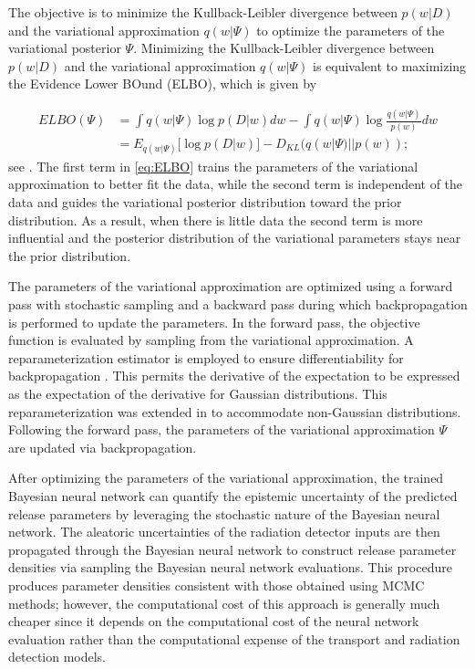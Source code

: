 \documentclass[sn-mathphys-ay]{sn-jnl}
\begin{document}
The objective is to minimize the Kullback-Leibler divergence between $p(w | D)$ and the variational approximation $q(w | \Psi)$ to optimize the parameters of the variational posterior $\Psi$. Minimizing the Kullback-Leibler divergence between $p(w | D)$ and the variational approximation $q(w | \Psi)$ is equivalent to maximizing the Evidence Lower BOund (ELBO), which is given by

\begin{equation}
\begin{split}
\label{eq:ELBO}
ELBO(\Psi) &= \int q(w | \Psi) \log{p(D | w)}dw - \int q(w |\Psi)\log{\frac{q(w | \Psi)}{p(w)}} dw \\
&=E_{q(w |\Psi)}\big[\log{p(D | w)}\big]-D_{KL}(q(w |\Psi)|| p(w)); 
\end{split}
\end{equation}
see \citep{Cinelli}. The first term in \eqref{eq:ELBO} trains the parameters of the variational approximation to better fit the data, while the second term is independent of the data and guides the variational posterior distribution toward the prior distribution. As a result, when there is little data the second term is more influential and the posterior distribution of the variational parameters stays near the prior distribution.

The parameters of the variational approximation are optimized using a forward pass with stochastic sampling and a backward pass during which backpropagation is performed to update the parameters. In the forward pass, the objective function is evaluated by sampling from the variational approximation. A reparameterization estimator is employed to ensure differentiability for backpropagation \citep{Kingma}. This permits the derivative of the expectation to be expressed as the expectation of the derivative for Gaussian distributions. This reparameterization was extended in \citep{Blundell} to accommodate non-Gaussian distributions. Following the forward pass, the parameters of the variational approximation $\Psi$ are updated via backpropagation.

After optimizing the parameters of the variational approximation, the trained Bayesian neural network can quantify the epistemic uncertainty of the predicted release parameters by leveraging the stochastic nature of the Bayesian neural network. The aleatoric uncertainties of the radiation detector inputs are then propagated through the Bayesian neural network to construct release parameter densities via sampling the Bayesian neural network evaluations. This procedure produces parameter densities consistent with those obtained using MCMC methods; however, the computational cost of this approach is generally much cheaper since it depends on the computational cost of the neural network evaluation rather than the computational expense of the transport and radiation detection models.
\end{document}
